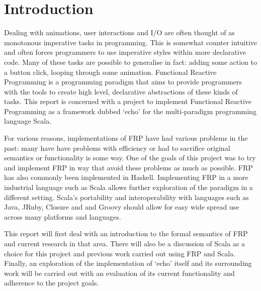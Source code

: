 \chapter{Introduction}

Dealing with animations, user interactions and I/O are often thought of as monotonous imperative tasks
in programming. This is somewhat counter intuitive and often forces programmers to use imperative
styles within more declarative code. Many of these tasks are possible to generalise in fact: adding
some action to a button click, looping through some animation. Functional Reactive Programming
is a programming paradigm that aims to provide programmers with the tools to create high level,
declarative abstractions of these kinds of tasks. This report is concerned with a project to
implement Functional Reactive Programming as a framework dubbed `echo' for the multi-paradigm programming language
Scala.

For various reasons, implementations of FRP have had various problems in the past: many have have problems
with efficiency or had to sacrifice original semantics or functionality is some way. One of the goals
of this project was to try and implement FRP in way that avoid these problems as much as possible. FRP
has also commonly been implemented in Haskell. Implementing FRP in a more industrial language such as Scala allows
further exploration of the paradigm in a different setting. Scala's portability and interoperability with
languages such as Java, JRuby, Closure and and Groovy should allow for easy wide spread use across many platforms and languages. 

This report will first deal with an introduction to the formal semantics of FRP and current research in that area.
There will also be a discussion of Scala as a choice for this project and previous work carried out using FRP and Scala.
Finally, an exploration of the implementation of `echo' itself and its surrounding work will be carried out with an
evaluation of its current functionality and adherence to the project goals.